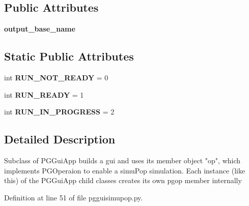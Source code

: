 \subsection*{Public Attributes}
\begin{DoxyCompactItemize}
\item 
{\bfseries output\+\_\+base\+\_\+name}\hypertarget{classnegui_1_1pgguisimupop_1_1PGGuiSimuPop_aa5f9f17f0527c20e5556b574a3f97300}{}\label{classnegui_1_1pgguisimupop_1_1PGGuiSimuPop_aa5f9f17f0527c20e5556b574a3f97300}

\end{DoxyCompactItemize}
\subsection*{Static Public Attributes}
\begin{DoxyCompactItemize}
\item 
int {\bfseries R\+U\+N\+\_\+\+N\+O\+T\+\_\+\+R\+E\+A\+DY} = 0\hypertarget{classnegui_1_1pgguisimupop_1_1PGGuiSimuPop_ae82d4be656ee869a30087fe2bab1410e}{}\label{classnegui_1_1pgguisimupop_1_1PGGuiSimuPop_ae82d4be656ee869a30087fe2bab1410e}

\item 
int {\bfseries R\+U\+N\+\_\+\+R\+E\+A\+DY} = 1\hypertarget{classnegui_1_1pgguisimupop_1_1PGGuiSimuPop_ab29a3c49b505f46c6a648dce7772fa80}{}\label{classnegui_1_1pgguisimupop_1_1PGGuiSimuPop_ab29a3c49b505f46c6a648dce7772fa80}

\item 
int {\bfseries R\+U\+N\+\_\+\+I\+N\+\_\+\+P\+R\+O\+G\+R\+E\+SS} = 2\hypertarget{classnegui_1_1pgguisimupop_1_1PGGuiSimuPop_a023efccec69461c3f9898383c24bb24b}{}\label{classnegui_1_1pgguisimupop_1_1PGGuiSimuPop_a023efccec69461c3f9898383c24bb24b}

\end{DoxyCompactItemize}


\subsection{Detailed Description}
\begin{DoxyVerb}Subclass of PGGuiApp builds a gui and uses its member object "op", which
implements PGOperaion to enable a  simuPop simulation. Each instance (like this)
of the PGGuiApp child classes creates its own pgop member internally
\end{DoxyVerb}
 

Definition at line 51 of file pgguisimupop.\+py.



